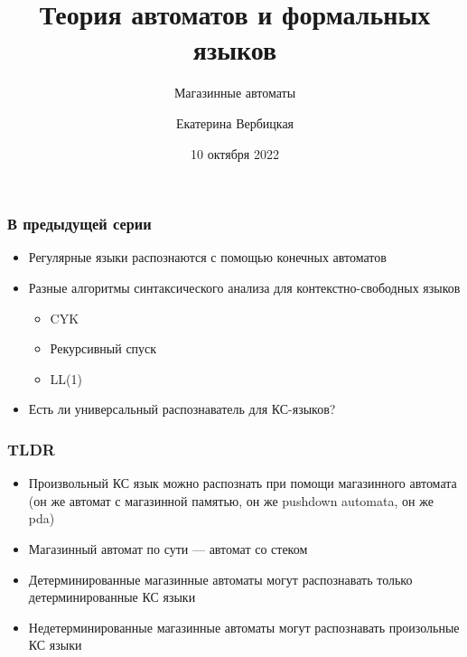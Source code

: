 \documentclass[dvipsnames]{beamer}
\title[]{Теория автоматов и формальных языков}
\subtitle[]{Магазинные автоматы}
\institute[]{
НИУ-ВШЭ\\
}
\author[]{Екатерина Вербицкая}
\date{10 октября 2022}
\begin{document}
{
  \begin{frame}
    \titlepage
  \end{frame}
}

\begin{frame}[fragile]
  \frametitle{В предыдущей серии}
  \begin{itemize}
    \item Регулярные языки распознаются с помощью конечных автоматов
    \item Разные алгоритмы синтаксического анализа для контекстно-свободных языков
    \begin{itemize}
    	\item CYK
    	\item Рекурсивный спуск
    	\item LL(1)
    \end{itemize}
    \item Есть ли универсальный распознаватель для КС-языков?
  \end{itemize}
\end{frame}

\begin{frame}[fragile]
  \frametitle{TLDR}
  \begin{itemize}
  	\item Произвольный КС язык можно распознать при помощи магазинного автомата (он же автомат с магазинной памятью, он же pushdown automata, он же pda)
  	\item Магазинный автомат по сути --- автомат со стеком
  	\item Детерминированные магазинные автоматы могут распознавать только детерминированные КС языки
  	\item Недетерминированные магазинные автоматы могут распознавать произольные КС языки
  \end{itemize}
\end{frame}
\end{document}
